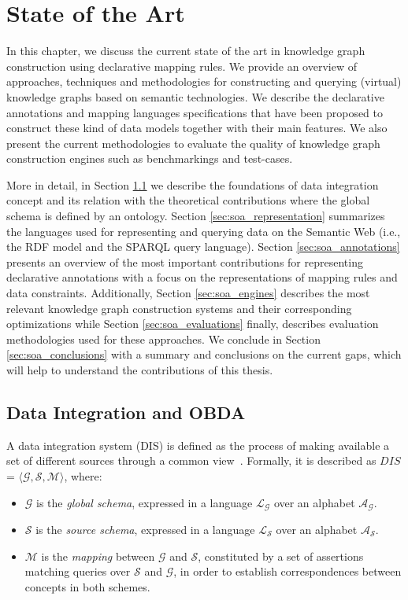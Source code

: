 \chapter{State of the Art}
\label{chap:soa}

In this chapter, we discuss the current state of the art in knowledge graph construction using declarative mapping rules. We provide an overview of approaches, techniques and methodologies for constructing and querying (virtual) knowledge graphs based on semantic technologies. We describe the declarative annotations and mapping languages specifications that have been proposed to construct these kind of data models together with their main features. We also present the current methodologies to evaluate the quality of knowledge graph construction engines such as benchmarkings and test-cases. 

More in detail, in Section \ref{sec:soa_integration} we describe the foundations of data integration concept and its relation with the theoretical contributions where the global schema is defined by an ontology. Section \ref{sec:soa_representation} summarizes the languages used for representing and querying data on the Semantic Web (i.e., the RDF model and the SPARQL query language). Section \ref{sec:soa_annotations} presents an overview of the most important contributions for representing declarative annotations with a focus on the representations of mapping rules and data constraints. Additionally, Section \ref{sec:soa_engines} describes the most relevant knowledge graph construction systems and their corresponding optimizations while Section \ref{sec:soa_evaluations} finally, describes evaluation methodologies used for these approaches. We conclude in Section \ref{sec:soa_conclusions} with a summary and conclusions on the current gaps, which will help to understand the contributions of this thesis.


\section{Data Integration and OBDA}
\label{sec:soa_integration}
A data integration system (DIS) is defined as the process of making available a set of different sources through a common view~\citep{Lenzerini02}. Formally, it is described as $DIS$ = $\langle \mathcal{G}, \mathcal{S}, \mathcal{M} \rangle$, where:
\begin{itemize}
    \item $\mathcal{G}$ is the \textit{global schema}, expressed in a language $\mathcal{L_G}$ over an alphabet $\mathcal{A_G}$.
    
    \item $\mathcal{S}$ is the \textit{source schema}, expressed in a language $\mathcal{L_S}$ over an alphabet $\mathcal{A_S}$.
    
    \item $\mathcal{M}$ is the \textit{mapping} between $\mathcal{G}$ and $\mathcal{S}$, constituted by a set of assertions matching queries over $\mathcal{S}$ and $\mathcal{G}$, in order to establish correspondences between concepts in both schemes.
\end{itemize}

